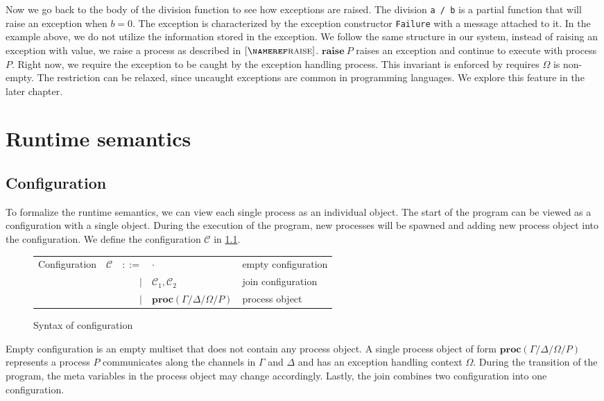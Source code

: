 \documentclass[12pt, openany]{memoir}
\newcommand*{\craise}[1]{\textbf{raise}\ #1}
\newcommand*{\procObj}[4]{\textbf{proc}(#1/#2/#3/#4)}
\newcommand*{\config}[0]{\mathcal{C}}
\begin{document}
Now we go back to the body of the division function to see how exceptions are raised.
The division \texttt{a / b} is a partial function that will raise an exception when $b = 0$.
The exception is characterized by the exception constructor \texttt{Failure} with a message attached to it.
In the example above, we do not utilize the information stored in the exception. 
We follow the same structure in our system, instead of raising an exception with value, 
we raise a process as described in $\ruleref{raise}$. 
$\craise{P}$ raises an exception and continue to execute with process $P$. 
Right now, we require the exception to be caught by the exception handling process.
This invariant is enforced by requires $\Omega$ is non-empty.
The restriction can be relaxed, since uncaught exceptions are common in programming languages. 
We explore this feature in the later chapter.

\chapter{Runtime semantics}
\section{Configuration}
To formalize the runtime semantics, we can view each single process as an individual object.
The start of the program can be viewed as a configuration with a single object.
During the execution of the program, new processes will be spawned and adding new process object into the configuration.
We define the configuration $\config$ in \cref{fig:config}.
\begin{figure}[H]
  \centering
  \begin{tabular}{r r r l l}
    Configuration & $\config$ & $::=$ & $\cdot$ & empty configuration \\
    & & $\mid$ & $\config_1, \config_2$ & join configuration \\
    & & $\mid$ & $\procObj{\Gamma}{\Delta}{\Omega}{P}$ & process object
   \end{tabular}
  \caption{Syntax of configuration}
  \label{fig:config}
\end{figure}
Empty configuration is an empty multiset that does not contain any process object.
A single process object of form $\procObj{\Gamma}{\Delta}{\Omega}{P}$ represents a process $P$
communicates along the channels in $\Gamma$ and $\Delta$ and has an exception handling context $\Omega$.
During the transition of the program, the meta variables in the process object may change accordingly.
Lastly, the join combines two configuration into one configuration.
\end{document}
